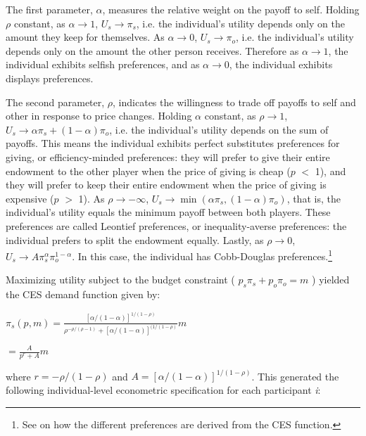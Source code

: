 \documentclass[12pt]{article}
\begin{document}
The first parameter, \(\alpha\), measures the relative weight on the payoff to self. Holding \(\rho\) constant, as \(\alpha \rightarrow 1\), \(U_{s} \rightarrow \pi_{s}\), i.e. the individual\rq s utility depends only on the amount they keep for themselves. As \(\alpha \rightarrow 0\), \(U_{s} \rightarrow \pi_{o}\), i.e. the individual\rq s utility depends only on the amount the other person receives. Therefore as \(\alpha \rightarrow 1\), the individual exhibits selfish preferences, and as \(\alpha \rightarrow 0\), the individual exhibits displays preferences.

The second parameter, \(\rho\), indicates the willingness to trade off payoffs to self and other in response to price changes. Holding \(\alpha\) constant, as \(\rho \rightarrow 1\), \(U_{s} \rightarrow \alpha\pi_{s} + (1-\alpha)\pi_{o}\),  i.e. the individual\rq s utility depends on the sum of payoffs. This means the individual exhibits perfect substitutes preferences for giving, or efficiency-minded preferences: they will prefer to give their entire endowment to the other player when the price of giving is cheap (\(p\) $<$ 1), and they will prefer to keep their entire endowment when the price of giving is expensive (\(p\) $>$ 1). As \(\rho \rightarrow -\infty\), \(U_{s} \rightarrow \min(\alpha\pi_{s}, (1-\alpha)\pi_{o})\), that is, the individual\rq s utility equals the minimum payoff between both players. These preferences are called Leontief preferences, or inequality-averse preferences: the individual prefers to split the endowment equally. Lastly, as \(\rho \rightarrow 0\), \(U_{s} \rightarrow A\pi_{s}^{\alpha}\pi_{o}^{1-\alpha}\). In this case, the individual has Cobb-Douglas preferences.\footnote{See \cite{arrow_1961} on how the different preferences are derived from the CES function.}

Maximizing utility subject to the budget constraint ( \(p_{s}\pi_{s} + p_{o}\pi_{o}=m\) ) yielded the CES demand function given by:
 
\vspace{3mm} \(\pi_{s}(p,m)=\frac{[\alpha/(1-\alpha)]^{1/(1-\rho)}}{\rho^{-\rho/(\rho-1)}+[\alpha/(1-\alpha)]^{(1/(1-\rho)}}m\)

\vspace{4mm} \hspace{14.5mm} \(= \frac{A}{p^{r}+A}m\)
 
\vspace{3mm} \noindent where \(r=-\rho / (1-\rho) \) and \(A=[\alpha / (1-\alpha)]^{1/(1-\rho)} \). This generated the following individual-level econometric specification for each participant \textit{i}: 
 
\end{document}
